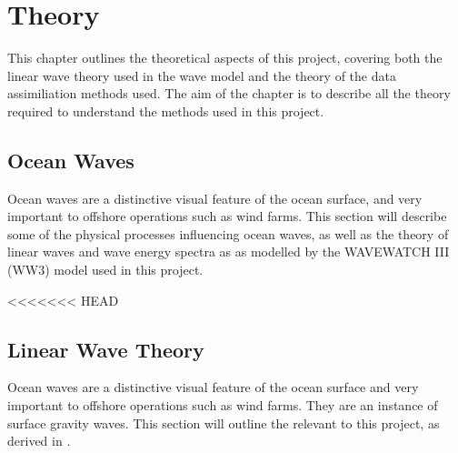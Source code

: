 
\chapter{Theory} %

\label{Chapter2} %

This chapter outlines the theoretical aspects of this project, covering both the linear wave theory used in the wave model and the theory of the data assimiliation methods used. The aim of the chapter is to describe all the theory required to understand the methods used in this project.

\section{Ocean Waves}

Ocean waves are a distinctive visual feature of the ocean surface, and very important to offshore operations such as wind farms. This section will describe some of the physical processes influencing ocean waves, as well as the theory of linear waves and wave energy spectra as as modelled by the WAVEWATCH III (WW3) model used in this project.

<<<<<<< HEAD


\section{Linear Wave Theory}

Ocean waves are a distinctive visual feature of the ocean surface\remove{,} and very important to offshore operations such as wind farms. They are an instance of surface gravity waves. This section will outline the  relevant to this project, as derived in \parencite[page 253]{vallis_atmospheric_2017}.

